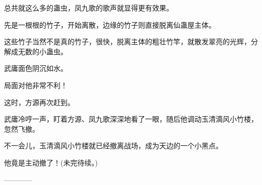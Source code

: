 \begin{this_body}
总共就这么多的蛊虫，凤九歌的歌声就显得更有效果。

先是一根根的竹子，开始离散，边缘的竹子则直接脱离仙蛊屋主体。

这些竹子当然不是真的竹子，很快，脱离主体的粗壮竹竿，就散发翠亮的光辉，分解成无数的小蛊虫。

武庸面色阴沉如水。

局面对他非常不利！

这时，方源再次赶到。

武庸冷哼一声，盯着方源、凤九歌深深地看了一眼，随后他调动玉清滴风小竹楼，忽然飞撤。

不一会儿，玉清滴风小竹楼就已经撤离战场，成为天边的一个小黑点。

他竟是主动撤了！(未完待续。)

------------

\end{this_body}

